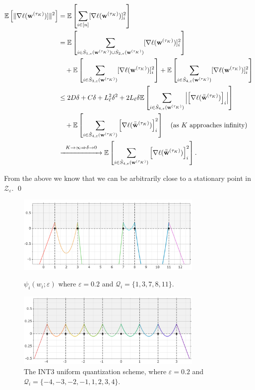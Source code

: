 \documentclass[10pt,a4paper]{article}
\begin{document}
\[\begin{aligned}\mathbb{E}\left[\lVert\nabla \ell(\mathbf{w}^{(\tau_{K})})]\rVert^2\right] &=\mathbb{E}\left[\sum\limits_{i\in[n]} [\nabla \ell(\mathbf{w}^{(\tau_{K})})]_i^2\right] \\&=\mathbb{E}\left[\sum\limits_{i\in\hat{S}_{1,\varepsilon}(\mathbf{w}^{(\tau_{K})})\cup \hat{S}_{2,\varepsilon}(\mathbf{w}^{(\tau_{K})})} [\nabla \ell(\mathbf{w}^{(\tau_{K})})]_i^2\right]\\&\quad+\mathbb{E}\left[\sum\limits_{i\in\hat{S}_{3,\varepsilon}(\mathbf{w}^{(\tau_{K})})} [\nabla \ell(\mathbf{w}^{(\tau_{K})})]_i^2\right]+\mathbb{E}\left[\sum\limits_{i\in\hat{S}_{4,\varepsilon}(\mathbf{w}^{(\tau_{K})})} [\nabla \ell(\mathbf{w}^{(\tau_{K})})]_i^2\right] \\
&\leq 2D\delta+C\delta+L_\ell^2\delta^2+2L_\ell\delta\mathbb{E}\left[\sum\limits_{i\in\hat{S}_{4,\varepsilon}(\mathbf{w}^{(\tau_K)})}\left|\left[ \nabla\ell(\bar{\bar{\mathbf{w}}}^{(\tau_K)})\right]_i\right|\right]\\
&\quad+\mathbb{E}\left[\sum\limits_{i\in\hat{S}_{4,\varepsilon}(\mathbf{w}^{(\tau_K)})}\left[ \nabla\ell(\bar{\bar{\mathbf{w}}}^{(\tau_K)})\right]_i^2\right]\quad \text{(as }K\text{ approaches infinity)}\\
&\overset{K\to\infty\Rightarrow\delta\to 0}{\xrightarrow{\hspace*{2cm}}} \mathbb{E}\left[\sum\limits_{i\in\hat{S}_{4,\varepsilon}(\mathbf{w}^{(\tau_K)})}\left[ \nabla\ell(\bar{\bar{\mathbf{w}}}^{(\tau_K)})\right]_i^2\right].\end{aligned}\]

From the above we know that we can be arbitrarily close to a stationary point in $\mathcal{Z}_\varepsilon$. \qed

\begin{figure}[H]
  \centering
  \includegraphics[width=0.8\textwidth]{psi.png}
  \caption{$\psi_i(w_i;\varepsilon)$ where $\varepsilon=0.2$ and $\mathcal{Q}_i=\{1,3,7,8,11\}$.}
  \includegraphics[width=0.8\textwidth]{psi2.png}
  \caption{The INT3 uniform quantization scheme, where $\varepsilon=0.2$ and $\mathcal{Q}_i=\{-4,-3,-2,-1,1,2,3,4\}$.}

\end{figure}
\end{document}
